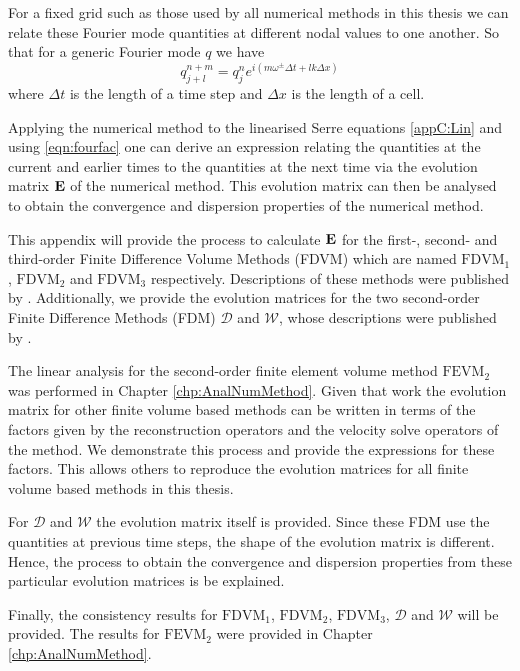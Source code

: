 For a fixed grid such as those used by all numerical methods in this thesis we can relate these Fourier mode quantities at different nodal values to one another. So that for a generic Fourier mode $q$ we have
\begin{equation}
q^{n + m}_{j + l} = q^n_j e^{ i \left(m \omega^\pm \Delta t + l k \Delta x\right)}
\label{eqn:fourfac}
\end{equation}
where $\Delta t$ is the length of a time step and $\Delta x$ is the length of a cell. 


Applying the numerical method to the linearised Serre equations \eqref{appC:Lin} and using \eqref{eqn:fourfac} one can derive an expression relating the quantities at the current and earlier times to the quantities at the next time via the evolution matrix $\mathbf{E}$ of the numerical method. This evolution matrix can then be analysed to obtain the convergence and dispersion properties of the numerical method. 

This appendix will provide the process to calculate $\mathbf{E}$ for the first-, second- and third-order Finite Difference Volume Methods (FDVM) which are named $\text{FDVM}_1$, $\text{FDVM}_2$ and $\text{FDVM}_3$ respectively. Descriptions of these methods were published by \citet{Zoppou-etal-2017}. Additionally, we provide the evolution matrices for the two second-order Finite Difference Methods (FDM) $\mathcal{D}$ and $\mathcal{W}$, whose descriptions were published by \citet{Pitt-2018-61}. 

The linear analysis for the second-order finite element volume method $\text{FEVM}_2$ was performed in Chapter \ref{chp:AnalNumMethod}. Given that work the evolution matrix for other finite volume based methods can be written in terms of the factors given by the reconstruction operators and the velocity solve operators of the method. We demonstrate this process and provide the expressions for these factors. This allows others to reproduce the evolution matrices for all finite volume based methods in this thesis. 

For $\mathcal{D}$ and $\mathcal{W}$ the evolution matrix itself is provided. Since these FDM use the quantities at previous time steps, the shape of the evolution matrix is different. Hence, the process to obtain the convergence and dispersion properties from these particular evolution matrices is be explained. 

Finally, the consistency results for $\text{FDVM}_1$, $\text{FDVM}_2$, $\text{FDVM}_3$, $\mathcal{D}$ and $\mathcal{W}$ will be provided. The results for $\text{FEVM}_2$ were provided in Chapter \ref{chp:AnalNumMethod}. 



